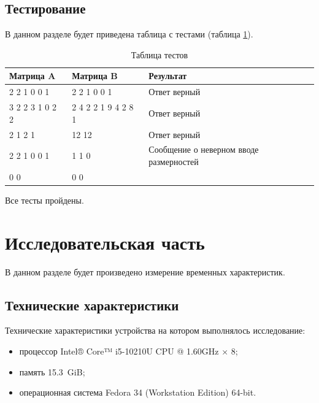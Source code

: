 \documentclass[12pt,a4paper]{report}
\begin{document}
\section{Тестирование}


В данном разделе будет приведена таблица с тестами (таблица \ref{table:ref1}).

\begin{table}[ht]
	\centering
	\caption{Таблица тестов}
	\label{table:ref1}
	\begin{tabular}{ | l | l | l |}
		\hline
		Матрица A       & Матрица B           & Результат                               \\ \hline
		2 2 1 0 0 1     & 2 2 1 0 0 1         & Ответ верный                            \\ \hline
		3 2 2 3 1 0 2 2 & 2 4 2 2 1 9 4 2 8 1 & Ответ верный                            \\ \hline
		2 1 2 1         & 12 12               & Ответ верный                            \\ \hline
		2 2 1 0 0 1     & 1 1 0               & Сообщение о неверном вводе размерностей \\ \hline
		0 0             & 0 0                 &                                         \\ \hline
		\hline
	\end{tabular}
\end{table}

Все тесты пройдены.


\newpage
\chapter{Исследовательская часть} 



В данном разделе будет произведено измерение временных характеристик.

\section{Технические характеристики}


Технические характеристики устройства на котором выполнялось исследование:
\begin{itemize}
	\item процессор Intel® Core™ i5-10210U CPU @ 1.60GHz × 8;
	\item память 15.3 GiB;
	\item операционная система Fedora 34 (Workstation Edition) 64-bit.
\end{itemize}
\end{document}
